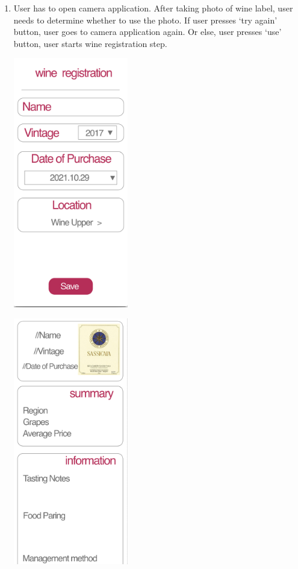 \documentclass[conference]{IEEEtran}
\numberwithin{figure}{subsection}
\begin{document}
\begin{enumerate}
\begin{enumerate}
\begin{enumerate}
        \item User has to open camera application. After taking photo of wine label, user needs to determine whether to use the photo. If user presses ‘try again’ button, user goes to camera application again. Or else, user presses ‘use’ button, user starts wine registration step.
        \centerline{\includegraphics[width=5cm]{regiinfo.png}}
        \centerline{\includegraphics[width=5cm]{wineinfo.png}}

\end{enumerate}
\end{enumerate}
\end{enumerate}
\end{document}
